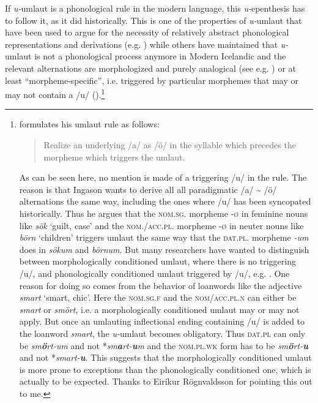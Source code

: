 \documentclass[output=paper,
modfonts
]{LSP/langsci}
\begin{document}
\noindent If \emph{u-}umlaut is a phonological rule in the modern language, this
\emph{u-}epenthesis has to follow it, as it did historically. This is
one of the properties of \emph{u-}umlaut that have been used to argue
for the necessity of relatively abstract phonological representations
and derivations (e.g. \citealt{anderson1969a,anderson1974,roegnvaldsson1981,thrainsson2011,hansson2013}) while others have maintained that
\emph{u-}umlaut is not a phonological process anymore in Modern
Icelandic and the relevant alternations are morphologized and purely
analogical (see e.g. \citealt{markusson2012}) or at least ``morpheme-specific'',
i.e. triggered by particular morphemes that may or may not contain a /u/
(\citealt{ingason2016}).\footnote{\citet[220]{ingason2016} formulates his umlaut rule as follows:

  \begin{quote}
  Realize an underlying /a/ as /ö/ in the syllable which precedes the
  morpheme which triggers the umlaut.
  \end{quote}

  \noindent As can be seen here, no mention is made of a triggering /u/ in the
  rule. The reason is that Ingason wants to derive all all paradigmatic
  /a/ \textasciitilde{} /ö/ alternations the same way, including the
  ones where /u/ has been syncopated historically. Thus he argues that
  the \textsc{nom.sg.} morpheme -\textsc{ø} in feminine nouns like
  \emph{sök} `guilt, case' and the \textsc{nom./acc.pl.} morpheme
  -\textsc{ø} in neuter nouns like \emph{börn} `children' triggers
  umlaut the same way that the \textsc{dat.pl.} morpheme \emph{-um} does
  in \emph{sökum} and \emph{börnum}. But many researchers have wanted to
  distinguish between morphologically conditioned umlaut, where there is
  no triggering /u/, and phonologically conditioned umlaut triggered by
  /u/, e.g. \citet{roegnvaldsson1981}. One reason for doing so comes from the
  behavior of loanwords like the adjective \emph{smart} `smart, chic'.
  Here the \textsc{nom.sg.f} and the \textsc{nom/acc.pl.n} can either be
  \emph{smart} or \emph{smört}, i.e. a morphologically conditioned
  umlaut may or may not apply. But once an umlauting inflectional ending
  containing /u/ is added to the loanword \emph{smart}, the
  \emph{u-}umlaut becomes obligatory. Thus \textsc{dat.pl} can only be
  \emph{sm\textbf{ö}rt-um} and not *\emph{sm\textbf{a}rt-\textbf{u}m}
  and the \textsc{nom.pl.wk} form has to be
  \emph{sm\textbf{ö}rt-\textbf{u}} and not *\emph{smart-\textbf{u}}.
  This suggests that the morphologically conditioned umlaut is more
  prone to exceptions than the phonologically conditioned one, which is
  actually to be expected. Thanks to Eiríkur Rögnvaldsson for pointing
  this out to me.}
\end{document}
